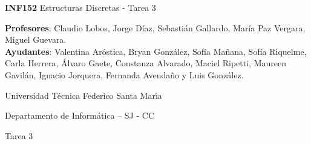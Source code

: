 \documentclass[letterpaper,10pt]{article}
\begin{document}
\thispagestyle{empty}
 	
\begin{minipage}[t]{0.6\textwidth}

{\LARGE \textbf{INF152} Estructuras Discretas - Tarea 3}

{\large \textbf{Profesores}: Claudio Lobos, Jorge Díaz, Sebastián Gallardo, María Paz Vergara, Miguel Guevara.}\\
{\small \textbf{Ayudantes}: Valentina Aróstica, Bryan González, Sofía Mañana, Sofía Riquelme, Carla Herrera, Álvaro Gaete, Constanza Alvarado, Maciel Ripetti, Maureen Gavilán, Ignacio Jorquera, Fernanda Avendaño y Luis González.} 

Universidad T\'ecnica Federico Santa Mar\'{\i}a

Departamento de Inform\'atica -- SJ - CC 



\end{minipage}
\hfill



\vspace{0.3cm}


\begin{center}
    \huge Tarea 3
\end{center}
\end{document}
